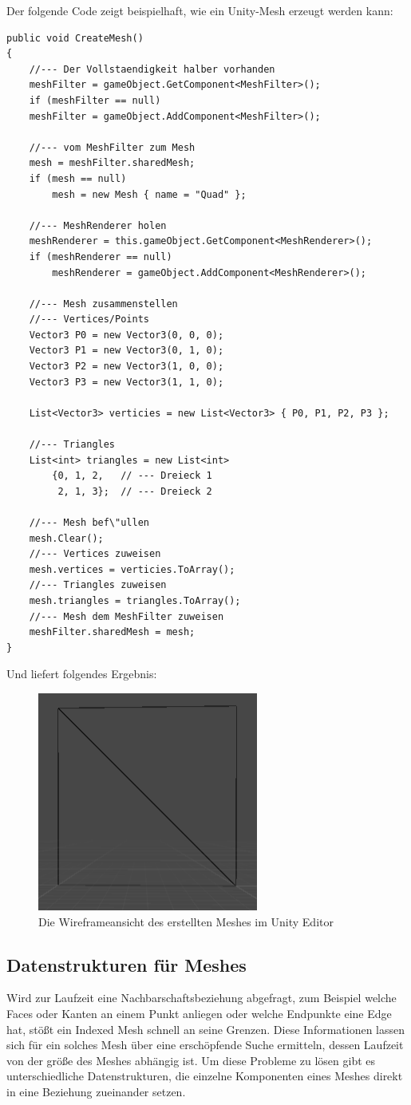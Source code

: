 Der folgende Code zeigt beispielhaft, wie ein Unity-Mesh erzeugt werden kann:
\begin{lstlisting}
public void CreateMesh()
{
	//--- Der Vollstaendigkeit halber vorhanden
	meshFilter = gameObject.GetComponent<MeshFilter>();
	if (meshFilter == null)
	meshFilter = gameObject.AddComponent<MeshFilter>();

	//--- vom MeshFilter zum Mesh
	mesh = meshFilter.sharedMesh;
	if (mesh == null)
		mesh = new Mesh { name = "Quad" };

	//--- MeshRenderer holen
	meshRenderer = this.gameObject.GetComponent<MeshRenderer>();
	if (meshRenderer == null)
		meshRenderer = gameObject.AddComponent<MeshRenderer>();

	//--- Mesh zusammenstellen
	//--- Vertices/Points
	Vector3 P0 = new Vector3(0, 0, 0);
	Vector3 P1 = new Vector3(0, 1, 0);
	Vector3 P2 = new Vector3(1, 0, 0);
	Vector3 P3 = new Vector3(1, 1, 0);

	List<Vector3> verticies = new List<Vector3> { P0, P1, P2, P3 };

	//--- Triangles
	List<int> triangles = new List<int> 
		{0, 1, 2, 	// --- Dreieck 1
		 2, 1, 3};	// --- Dreieck 2

	//--- Mesh bef\"ullen
	mesh.Clear();
	//--- Vertices zuweisen
	mesh.vertices = verticies.ToArray();
	//--- Triangles zuweisen
	mesh.triangles = triangles.ToArray();
	//--- Mesh dem MeshFilter zuweisen
	meshFilter.sharedMesh = mesh;
}
\end{lstlisting}

Und liefert folgendes Ergebnis:
\begin{figure}[h]
	\centering
	\includegraphics[width=0.35\linewidth]{Images/UnityQuadWireframe}
	\caption[Die Wireframeansicht des erstellten Meshes]{Die Wireframeansicht des erstellten Meshes im Unity Editor}
	\label{fig:unityquadwireframe}
\end{figure}

\subsection{Datenstrukturen f\"ur Meshes}
Wird zur Laufzeit eine Nachbarschaftsbeziehung abgefragt, zum Beispiel welche Faces oder Kanten an einem Punkt anliegen oder welche Endpunkte eine Edge hat, st\"o{\ss}t ein Indexed Mesh schnell an seine Grenzen. Diese Informationen lassen sich f\"ur ein solches Mesh \"uber eine ersch\"opfende Suche ermitteln, dessen Laufzeit von der gr\"o{\ss}e des Meshes abh\"angig ist. Um diese Probleme zu l\"osen gibt es unterschiedliche Datenstrukturen, die einzelne Komponenten eines Meshes direkt in eine Beziehung zueinander setzen.

